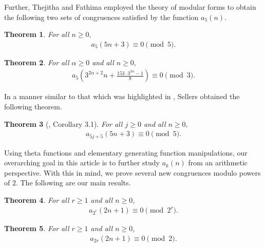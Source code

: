 \documentclass[a4paper,12pt,reqno]{amsart}
\newtheorem{theorem}{Theorem}[section]
\numberwithin{equation}{section}
\begin{document}
\noindent Further, Thejitha and Fathima \cite{r10} employed the theory of modular forms to obtain the following two sets of congruences satisfied by the function $a_5(n)$.
	\begin{theorem}\label{t:2.1.2}
		For all $n\geq0,$
		\begin{align*}
			a_5(5n+3)\equiv0 \pmod{5}.
		\end{align*}
	\end{theorem}
	\begin{theorem}\label{t:2.1.3}
		For all $\alpha \geq0$ and all $n\geq0,$
		\begin{align*}
			a_5\left(3^{2\alpha+2}n+\frac{153\cdot 3^{2\alpha}-1}{8}\right)\equiv 0\pmod{3}.
		\end{align*}
	\end{theorem}
	In a manner similar to that which was highlighted in \cite{r4}, Sellers \cite{r8} obtained the following theorem.  
	\begin{theorem}[\cite{r8}, Corollary 3.1]\label{t:2.1.4}
	For all $j \geq0$ and all $n\geq0,$
	\begin{align*}
		a_{5j+5}(5n+3)\equiv0\pmod{5}.
	\end{align*}
	\end{theorem}

	Using theta functions and elementary generating function manipulations, our overarching goal in this article is to further study $a_k(n)$ from an arithmetic perspective. With this in mind, we prove several new congruences modulo powers of $2$. The following are our main results.
	\begin{theorem}\label{t:2.1.5}
		For all $r \geq 1$ and all $n \geq 0$, 
		\begin{align*}
			a_{2^r}(2n+1) \equiv 0 \pmod {2^r}.
		\end{align*}
	\end{theorem}
	
	\begin{theorem}\label{t:2.1.6}
		For all $r \geq 1$ and all $n \geq 0$,  
		\begin{align*}
			a_{2r}(2n+1) \equiv 0 \pmod {2}.
		\end{align*}
	\end{theorem}
\end{document}
